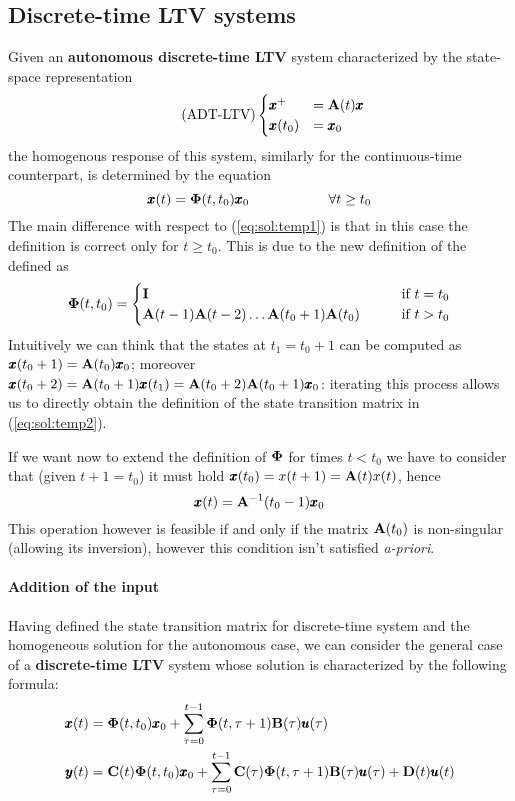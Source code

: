 \subsection*{Discrete-time LTV systems}
	Given an \textbf{autonomous discrete-time LTV} system characterized by the state-space representation
	\begin{equation} \tag{ADT-LTV}
		\begin{cases}
			\pmb{x}^+ & = \mathbf{A}(t) \pmb{x} \\ \pmb{x}(t_0) & = \pmb{x}_0
		\end{cases}
	\end{equation}
	the homogenous response of this system, similarly for the continuous-time counterpart, is determined by the equation
	\begin{equation}
		\pmb{x}(t) = \mathbf{\Phi}(t,t_0)\pmb{x}_0 \hspace{2cm} \forall t\geq t_0
	\end{equation}
	The main difference with respect to (\ref{eq:sol:temp1}) is that in this case the definition is correct only for $t \geq t_0$. This is due to the new definition of the  defined as
	\begin{equation} \label{eq:sol:temp2}
		\mathbf{\Phi}(t,t_0) = \begin{cases}
			\mathbf{I} & \textrm{if } t = t_0 \\
			\mathbf{A}(t-1)\mathbf{A}(t-2) \dots \mathbf{A}(t_0+1) \mathbf{A}(t_0) \qquad & \textrm{if } t > t_0
		\end{cases}
	\end{equation}
	Intuitively we can think that the states at $t_1=t_0+1$ can be computed as $\pmb{x}(t_0+1) = \mathbf{A}(t_0) \pmb{x}_0$; moreover $\pmb{x}(t_0+2) = \mathbf{A}(t_0+1) \pmb{x}(t_1) = \mathbf{A}(t_0+2)\mathbf{A}(t_0+1) \pmb{x}_0$: iterating this process allows us to directly obtain the definition of the state transition matrix in (\ref{eq:sol:temp2}).
	
	If we want now to extend the definition of $\mathbf{\Phi}$ for times $t < t_0$ we have to consider that (given $t+1=t_0$) it must hold $\pmb{x}(t_0) = x(t+1) = \mathbf{A}(t)x(t)$, hence
	\[ \pmb{x}(t) = \mathbf{A}^{-1}(t_0-1) \pmb{x}_0 \]
	This operation however is feasible if and only if the matrix $\mathbf{A}(t_0)$ is non-singular (allowing its inversion), however this condition isn't satisfied \textit{a-priori}.
	
	\paragraph{Addition of the input} Having defined the state transition matrix for discrete-time system and the homogeneous solution for the autonomous case, we can consider the general case of a \textbf{discrete-time LTV} system whose solution is characterized by the following  formula:
	\begin{equation} \label{eq:sol:varconstantdiscrete}
	\begin{split}
		\pmb{x}(t) & = \mathbf{\Phi}(t,t_0) \pmb{x}_0 + \sum_{\tau = 0}^{t-1} \mathbf{\Phi}(t,\tau+1) \mathbf{B}(\tau) \pmb{u}(\tau) \\
		\pmb{y}(t) & = \mathbf{C}(t)\mathbf{\Phi}(t,t_0) \pmb{x}_0 + \sum_{\tau = 0}^{t-1} \mathbf{C}(\tau) \mathbf{\Phi}(t,\tau+1) \mathbf{B}(\tau) \pmb{u}(\tau) + \mathbf{D}(t) \pmb{u}(t) 
	\end{split}
	\end{equation}
	
